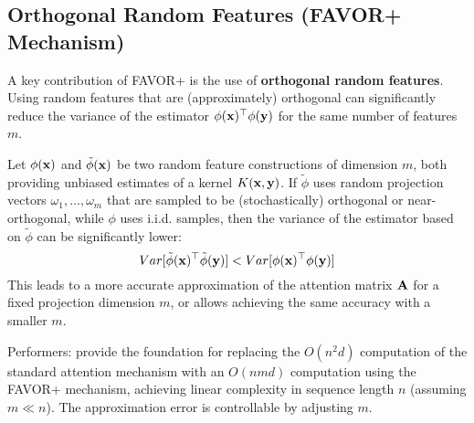 \documentclass[aspectratio=169]{beamer}
\begin{document}
\begin{frame}
	\subsection*{Orthogonal Random Features (FAVOR+ Mechanism)}

	A key contribution of FAVOR+ is the use of \textbf{orthogonal random features}.
	Using random features that are (approximately) orthogonal can significantly
	reduce the variance of the estimator $\phi(\mathbf{x})^\top \phi(\mathbf{y})$ for
	the same number of features $m$.

	\begin{theorem} \label{thm:performer_orthogonal}

		Let $\phi(\mathbf{x})$ and $\tilde{\phi}(\mathbf{x})$ be two random feature
		constructions of dimension $m$, both providing unbiased estimates of a
		kernel $K(\mathbf{x}, \mathbf{y})$. If $\tilde{\phi}$ uses random projection
		vectors $\omega_1, \dots, \omega_m$ that are sampled to be (stochastically)
		orthogonal or near-orthogonal, while $\phi$ uses i.i.d. samples, then the
		variance of the estimator based on $\tilde{\phi}$ can be significantly
		lower: $$ Var[\tilde{\phi}(\mathbf{x})^\top \tilde{\phi}(\mathbf{y})] <
		Var[\phi(\mathbf{x})^\top \phi(\mathbf{y})] $$ This leads to a more accurate
		approximation of the attention matrix $\mathbf{A}$ for a fixed projection
		dimension $m$, or allows achieving the same accuracy with a smaller $m$.
	\end{theorem}

\end{frame}
\begin{frame}

	Performers: provide the foundation for replacing the $O(n^2 d)$ computation of
	the standard attention mechanism with an $O(n m d)$ computation using the
	FAVOR+ mechanism, achieving linear complexity in sequence length $n$ (assuming
	$m \ll n$). The approximation error is controllable by adjusting $m$.

\end{frame}
\newcommand{\calO}{\mathcal{O}}
\newcommand{\relu}{\text{ReLU}}
\end{document}
